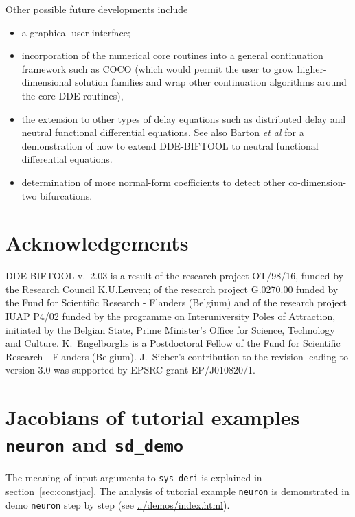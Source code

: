 \documentclass[10pt]{scrartcl}
\newcommand{\DDEBIFCODE}{\textsc{DDE-BIFTOOL}}
\newcommand{\demobase}{\url{../demos/index.html}}
\newcommand{\blist}[1]{\mbox{\lstinline!#1!}}
\begin{document}
{Other possible future developments include
\begin{itemize}
\item a graphical user interface;
\item incorporation of the numerical core
  routines into a general continuation framework such as \textsc{COCO}
  \cite{DS13} (which would permit the user to grow higher-dimensional
  solution families and wrap other continuation algorithms around the
  core DDE routines),
\item the extension to other types of delay equations such as
  distributed delay and neutral functional differential equations. See
  also Barton \emph{et al} \cite{Barton06} for a demonstration of how
  to extend \DDEBIFCODE{} to neutral functional differential
  equations.
\item determination of more normal-form coefficients to detect
  other co-dimension-two bifurcations.
\end{itemize}
\section*{Acknowledgements}

\DDEBIFCODE{} v.~2.03 is a result of the research project OT/98/16,
funded by the Research Council K.U.Leuven; of the research project
G.0270.00 funded by the Fund for Scientific Research - Flanders
(Belgium) and of the research project IUAP P4/02 funded by the
programme on Interuniversity Poles of Attraction, initiated by the
Belgian State, Prime Minister's Office for Science, Technology and
Culture.  K.~Engelborghs is a Postdoctoral Fellow of the Fund for
Scientific Research - Flanders (Belgium).  J.~Sieber's contribution to
the revision leading to version 3.0 was supported by EPSRC grant
EP/J010820/1.





\newpage
\appendix

\section{Jacobians of tutorial examples \texorpdfstring{\blist{neuron}}{neuron} and \texorpdfstring{\blist{sd_demo}}{sd\_demo}}
\label{sec:sys:deri}
The meaning of input arguments to \blist{sys_deri} is explained in
section~\ref{sec:constjac}. The analysis of tutorial example
\blist{neuron} is demonstrated in demo \texttt{neuron} step by step
(see \demobase{}).

}
\end{document}
